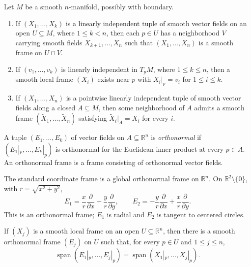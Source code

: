 \begin{proposition}
\label{prop:8-11}
\leanok
{}
Let $M$ be a smooth $n$-manifold, possibly with boundary.
\begin{enumerate}
\item If $(X_1,\ldots,X_k)$ is a linearly independent tuple of smooth vector
fields on an open $U\subseteq M$, where $1\leq k<n$, then each $p\in U$ has a
neighborhood $V$ carrying smooth fields $X_{k+1},\ldots,X_n$ such that
$(X_1,\ldots,X_n)$ is a smooth frame on $U\cap V$.
\item If $(v_1,\ldots,v_k)$ is linearly independent in $T_pM$, where
$1\leq k\leq n$, then a smooth local frame $(X_i)$ exists near $p$ with
$X_i|_p=v_i$ for $1\leq i\leq k$.
\item If $(X_1,\ldots,X_n)$ is a pointwise linearly independent tuple of
smooth vector fields along a closed $A\subseteq M$, then some neighborhood of
$A$ admits a smooth frame $(\widetilde X_1,\ldots,\widetilde X_n)$ satisfying
$\widetilde X_i|_A=X_i$ for every $i$.
\end{enumerate}
\end{proposition}

\begin{definition}
\label{def:8-55-extra-2}
\leanok
A tuple $(E_1,\ldots,E_k)$ of vector fields on $A\subseteq\mathbb{R}^n$ is
\emph{orthonormal} if $(E_1|_p,\ldots,E_k|_p)$ is orthonormal for the Euclidean
inner product at every $p\in A$. An orthonormal frame is a frame consisting of
orthonormal vector fields.
\end{definition}

\begin{example}
\label{ex:8-12}
\leanok
{}
The standard coordinate frame is a global orthonormal frame on $\mathbb{R}^n$.
On $\mathbb{R}^2\setminus\{0\}$, with $r=\sqrt{x^2+y^2}$,
\[
E_1=\frac{x}{r}\frac{\partial}{\partial x}
   +\frac{y}{r}\frac{\partial}{\partial y},\qquad
E_2=-\frac{y}{r}\frac{\partial}{\partial x}
   +\frac{x}{r}\frac{\partial}{\partial y}. \tag{8.3}
\]
This is an orthonormal frame; $E_1$ is radial and $E_2$ is tangent to centered
circles.
\end{example}

\begin{lemma}
\label{lem:8-13}
\leanok
{}
If $(X_j)$ is a smooth local frame on an open $U\subseteq\mathbb{R}^n$, then
there is a smooth orthonormal frame $(E_j)$ on $U$ such that, for every
$p\in U$ and $1\leq j\leq n$,
\[
\operatorname{span}(E_1|_p,\ldots,E_j|_p)
=\operatorname{span}(X_1|_p,\ldots,X_j|_p).
\]
\end{lemma}

